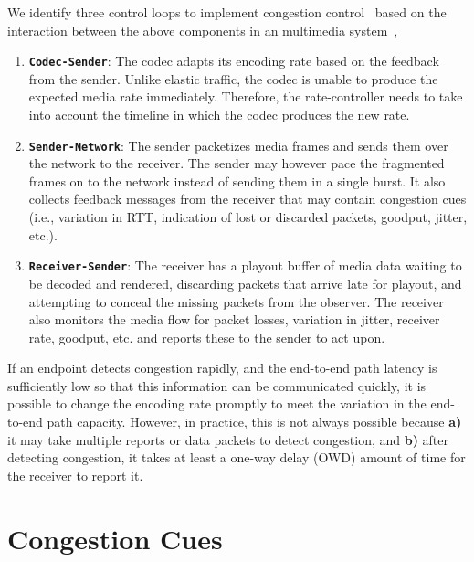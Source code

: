 We identify three control loops to implement congestion
control~\cite{Singh:control.loops.api} based on the interaction between the
above components in an multimedia system~\cite{draft.rmcat.app.interaction},

\begin{enumerate}
\setlength{\itemsep}{0pt}

\item \textbf{\texttt{Codec-Sender}}: The codec adapts its encoding rate based
on the feedback from the sender. Unlike elastic traffic, the codec is unable
to produce the expected media rate immediately. Therefore, the rate-controller
needs to take into account the timeline in which the codec produces the new
rate.

\item \textbf{\texttt{Sender-Network}}: The sender packetizes media frames and
sends them over the network to the receiver. The sender may however pace the
fragmented frames on to the network instead of sending them in a single
burst. It also collects feedback messages from the receiver that may contain
congestion cues (i.e., variation in RTT, indication of lost or discarded
packets, goodput, jitter, etc.).

\item \textbf{\texttt{Receiver-Sender}}: The receiver has a playout buffer of
media data waiting to be decoded and rendered, discarding packets that arrive
late for playout, and attempting to conceal the missing packets from the
observer. The receiver also monitors the media flow for packet losses,
variation in jitter, receiver rate, goodput, etc. and reports these to the
sender to act upon.

\end{enumerate}

If an endpoint detects congestion rapidly, and the end-to-end path latency is
sufficiently low so that this information can be communicated quickly, it is
possible to change the encoding rate promptly to meet the variation in the 
end-to-end path capacity. However, in practice, this is not always possible because
\textbf{a)} it may take multiple reports or data packets to detect congestion, and
\textbf{b)} after detecting congestion, it takes at least a one-way delay (OWD)
amount of time for the receiver to report it.


\section{Congestion Cues}
\label{fw.cues}

